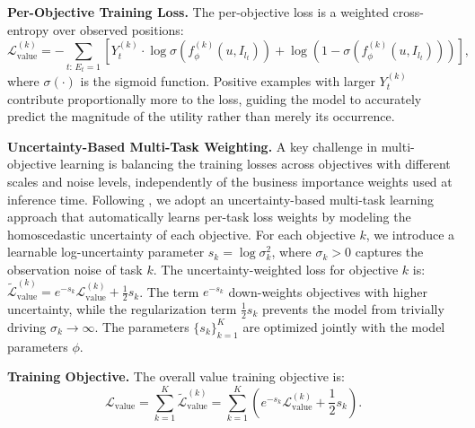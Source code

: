\documentclass[sigconf]{acmart}
\begin{document}
\vspace{0.5em}
\noindent\textbf{Per-Objective Training Loss.}
The per-objective loss is a weighted cross-entropy over observed positions:
\begin{equation}
\mathcal{L}_{\text{value}}^{(k)} =
-\sum_{t:\, E_t = 1}
\left[
Y_t^{(k)} \cdot \log \sigma\!\left(f_\phi^{(k)}(u, I_{l_t})\right)
+ \log \left(1 - \sigma\!\left(f_\phi^{(k)}(u, I_{l_t})\right)\right)
\right],
\end{equation}
where $\sigma(\cdot)$ is the sigmoid function. Positive examples with larger $Y_t^{(k)}$ contribute proportionally more to the loss, guiding the model to accurately predict the magnitude of the utility rather than merely its occurrence.

\vspace{0.5em}
\noindent\textbf{Uncertainty-Based Multi-Task Weighting.}
A key challenge in multi-objective learning is balancing the training losses across objectives with different scales and noise levels, independently of the business importance weights used at inference time. Following \citet{kendall2018multi}, we adopt an uncertainty-based multi-task learning approach that automatically learns per-task loss weights by modeling the homoscedastic uncertainty of each objective. For each objective $k$, we introduce a learnable log-uncertainty parameter $s_k = \log \sigma_k^2$, where $\sigma_k > 0$ captures the observation noise of task $k$. The uncertainty-weighted loss for objective $k$ is: $\widetilde{\mathcal{L}}_{\text{value}}^{(k)} = e^{-s_k} \mathcal{L}_{\text{value}}^{(k)} + \frac{1}{2} s_k$.
The term $e^{-s_k}$ down-weights objectives with higher uncertainty, while the regularization term $\frac{1}{2} s_k$ prevents the model from trivially driving $\sigma_k \to \infty$. The parameters $\{s_k\}_{k=1}^{K}$ are optimized jointly with the model parameters $\phi$.

\vspace{0.5em}
\noindent\textbf{Training Objective.}
The overall value training objective is:
\begin{equation}
\mathcal{L}_{\text{value}} = \sum_{k=1}^{K} \widetilde{\mathcal{L}}_{\text{value}}^{(k)}
= \sum_{k=1}^{K} \left( e^{-s_k} \mathcal{L}_{\text{value}}^{(k)} + \frac{1}{2} s_k \right).
\end{equation}
\end{document}
